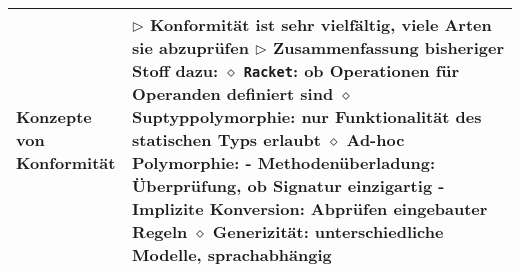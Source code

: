 \begin{longtable}{ | p{} p{} | }
	\makecell[l]{Konzepte von \\ Konformität} & \makecell[l]{
	$\rhd$ Konformität ist sehr vielfältig, viele Arten sie abzuprüfen \\
	$\rhd$ Zusammenfassung bisheriger Stoff dazu: \\
	\hspace{0.4cm} $\diamond$ \texttt{Racket}: ob Operationen für Operanden definiert sind \\
	\hspace{0.4cm} $\diamond$ Suptyppolymorphie: nur Funktionalität des statischen Typs erlaubt \\
	\hspace{0.4cm} $\diamond$ Ad-hoc Polymorphie: \\
	\hspace{0.6cm} - Methodenüberladung: Überprüfung, ob Signatur einzigartig \\
	\hspace{0.6cm} - Implizite Konversion: Abprüfen eingebauter Regeln \\
	\hspace{0.4cm} $\diamond$ Generizität: unterschiedliche Modelle, sprachabhängig} \\ \hline


\end{longtable}
